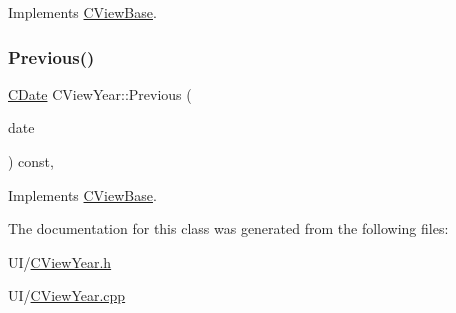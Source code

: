 Implements \mbox{\hyperlink{class_c_view_base_afac2271f0a54dfa083246d4e9c3d0742}{C\+View\+Base}}.

\mbox{\label{class_c_view_year_a638b9541c8e0396a263bcff37a126f81}} 
\subsubsection{\texorpdfstring{Previous()}{Previous()}}
{\footnotesize\ttfamily \mbox{\hyperlink{class_c_date}{C\+Date}} C\+View\+Year\+::\+Previous (\begin{DoxyParamCaption}\item[{const \mbox{\hyperlink{class_c_date}{C\+Date}} \&}]{date }\end{DoxyParamCaption}) const\hspace{0.3cm}{\ttfamily [override]}, {\ttfamily [virtual]}}



Implements \mbox{\hyperlink{class_c_view_base_a9f5365e3225fb1b96058a9f8a599db6b}{C\+View\+Base}}.



The documentation for this class was generated from the following files\+:\begin{DoxyCompactItemize}
\item 
U\+I/\mbox{\hyperlink{_c_view_year_8h}{C\+View\+Year.\+h}}\item 
U\+I/\mbox{\hyperlink{_c_view_year_8cpp}{C\+View\+Year.\+cpp}}\end{DoxyCompactItemize}
